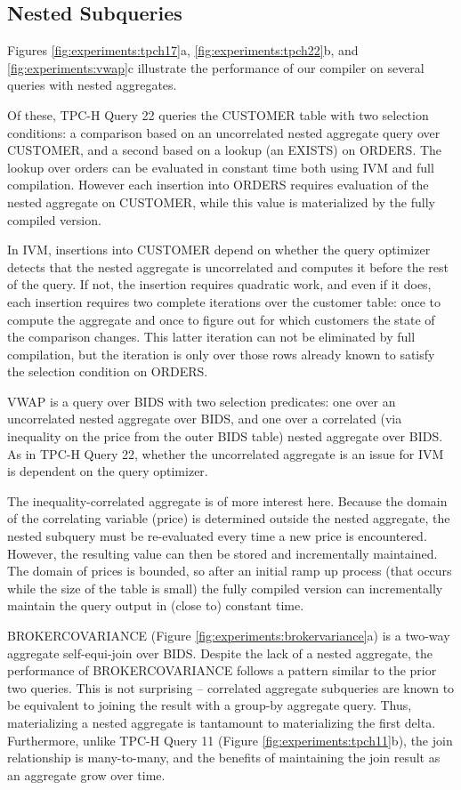 \subsection{Nested Subqueries}

Figures \ref{fig:experiments:tpch17}a, \ref{fig:experiments:tpch22}b, and \ref{fig:experiments:vwap}c illustrate the performance of our compiler on several queries with nested aggregates.

Of these, TPC-H Query 22 queries the CUSTOMER table with two selection conditions: a comparison based on an uncorrelated nested aggregate query over CUSTOMER, and a second based on a lookup (an EXISTS) on ORDERS.  The lookup over orders can be evaluated in constant time both using IVM and full compilation.  However each insertion into ORDERS requires evaluation of the nested aggregate on CUSTOMER, while this value is materialized by the fully compiled version.  

In IVM, insertions into CUSTOMER depend on whether the query optimizer detects that the nested aggregate is uncorrelated and computes it before the rest of the query.  If not, the insertion requires quadratic work, and even if it does, each insertion requires two complete iterations over the customer table: once to compute the aggregate and once to figure out for which customers the state of the comparison changes.  This latter iteration can not be eliminated by full compilation, but the iteration is only over those rows already known to satisfy the selection condition on ORDERS.

VWAP is a query over BIDS with two selection predicates: one over an uncorrelated nested aggregate over BIDS, and one over a correlated (via inequality on the price from the outer BIDS table) nested aggregate over BIDS.  As in TPC-H Query 22, whether the uncorrelated aggregate is an issue for IVM is dependent on the query optimizer.  

The inequality-correlated aggregate is of more interest here.  Because the domain of the correlating variable (price) is determined outside the nested aggregate, the nested subquery must be re-evaluated every time a new price is encountered.  However, the resulting value can then be stored and incrementally maintained.  The domain of prices is bounded, so after an initial ramp up process (that occurs while the size of the table is small) the fully compiled version can incrementally maintain the query output in (close to) constant time.

BROKERCOVARIANCE (Figure \ref{fig:experiments:brokervariance}a) is a two-way aggregate self-equi-join over BIDS.  Despite the lack of a nested aggregate, the performance of BROKERCOVARIANCE follows a pattern similar to the prior two queries.  This is not surprising -- correlated aggregate subqueries are known to be equivalent to joining the result with a group-by aggregate query.  Thus, materializing a nested aggregate is tantamount to materializing the first delta.  Furthermore, unlike TPC-H Query 11 (Figure \ref{fig:experiments:tpch11}b), the join relationship is many-to-many, and the benefits of maintaining the join result as an aggregate grow over time.

